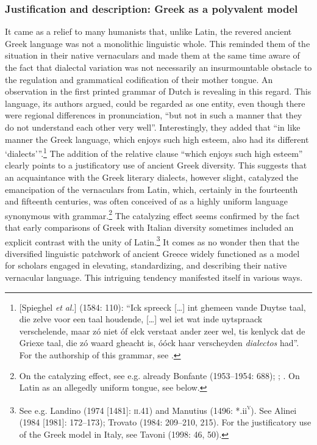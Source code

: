 \documentclass[output=paper]{langsci/langscibook}
\begin{document}
\subsubsection{Justification and description: Greek as a polyvalent model}
\hypertarget{Toc19704860}{}
It came as a relief to many humanists that, unlike Latin, the revered ancient Greek language was not a monolithic linguistic whole. This reminded them of the situation in their native vernaculars and made them at the same time aware of the fact that dialectal variation was not necessarily an insurmountable obstacle to the regulation and grammatical codification of their mother tongue. An observation in the first printed grammar of Dutch is revealing in this regard. This language, its authors argued, could be regarded as one entity, even though there were regional differences in pronunciation, “but not in such a manner that they do not understand each other very well”. Interestingly, they added that “in like manner the Greek language, which enjoys such high esteem, also had its different ‘dialects’”.\footnote{[Spieghel \textit{et} \textit{al.}] (1584: 110): “Ick spreeck […] int ghemeen vande Duytse taal, die zelve voor een taal houdende, […] wel iet wat inde uytspraack verschelende, maar zó niet óf elck verstaat ander zeer wel, tis kenlyck dat de Griexe taal, die zó waard gheacht is, óóck haar verscheyden \textit{dialectos} had”. For the authorship of this grammar, see \citet{Peeters1982}.} The addition of the relative clause “which enjoys such high esteem” clearly points to a justificatory use of ancient Greek diversity. This suggests that an acquaintance with the Greek literary dialects, however slight, catalyzed the emancipation of the vernaculars from Latin, which, certainly in the fourteenth and fifteenth centuries, was often conceived of as a highly uniform language synonymous with grammar.\footnote{On the catalyzing effect, see e.g. already Bonfante (1953–1954: 688); \citet[9]{Trapp1990}; \citet[67]{Rhodes2015}. On Latin as an allegedly uniform tongue, see  below.} The catalyzing effect seems confirmed by the fact that early comparisons of Greek with Italian diversity sometimes included an explicit contrast with the unity of Latin.\footnote{See e.g. Landino (1974 [1481]: \textsc{ii}.41) and Manutius (1496: *.ii\textsc{\textsuperscript{v}}). See Alinei (1984 [1981]: 172–173); Trovato (1984: 209–210, 215). For the justificatory use of the Greek model in Italy, see Tavoni (1998: 46, 50).} It comes as no wonder then that the diversified linguistic patchwork of ancient Greece widely functioned as a model for scholars engaged in elevating, standardizing, and describing their native vernacular language. This intriguing tendency manifested itself in various ways.
\end{document}
